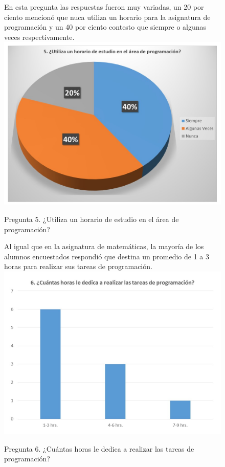 \documentclass[12pt] {report}
\begin{document}
\begin{figure}[H]
\centering
En esta pregunta las respuestas fueron muy variadas, un 20 por ciento mencionó que nuca utiliza un horario para la asignatura de programación y un 40 por ciento contesto que siempre o algunas veces respectivamente.  
\includegraphics[scale=.4]{pregunta5.JPG}
\caption{Pregunta 5. ¿Utiliza un horario de estudio en el área de programación?}
\end{figure}
\begin{figure}[H]
\centering
Al igual que en la asignatura de matemáticas, la mayoría de los alumnos encuestados respondió que destina un promedio de 1 a 3 horas para realizar sus tareas de programación.  
\includegraphics[scale=.4]{pregunta6.JPG}
\caption{Pregunta 6. ¿Cuántas horas le dedica a realizar las tareas de programación?}
\end{figure}
\end{document}
